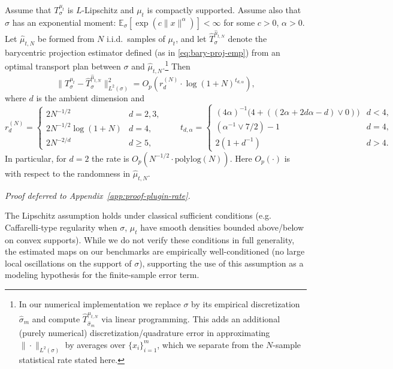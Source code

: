\documentclass[11pt]{article}
\newcommand{\1}{\mathbf{1}}
\begin{document}
\begin{proposition}
\label{prop:plug-in-rate}
Assume that $T_\sigma^{\mu_t}$ is $L$-Lipschitz and $\mu_t$ is compactly supported. Assume also that $\sigma$ has an exponential moment:
$\mathbb{E}_\sigma[\exp(c\|x\|^\alpha)] < \infty$ for some $c > 0$, $\alpha > 0$.
Let $\hat{\mu}_{t,N}$ be formed from $N$ i.i.d.\ samples of $\mu_t$, and let
$\hat{T}_\sigma^{\hat{\mu}_{t,N}}$ denote the barycentric projection estimator
defined (as in \eqref{eq:bary-proj-emp}) from an optimal transport plan between
$\sigma$ and $\hat{\mu}_{t,N}$.\footnote{In our numerical implementation we
replace $\sigma$ by its empirical discretization $\hat{\sigma}_m$ and compute
$\hat{T}_{\hat{\sigma}_m}^{\hat{\mu}_{t,N}}$ via linear programming. This adds
an additional (purely numerical) discretization/quadrature error in approximating
$\|\cdot\|_{L^2(\sigma)}$ by averages over $\{x_i\}_{i=1}^m$, which we separate
from the $N$-sample statistical rate stated here.}
Then
\begin{equation}\label{eq:plugin-rate}
  \|T_\sigma^{\mu_t}
  - \hat{T}_\sigma^{\hat{\mu}_{t,N}}\|_{L^2(\sigma)}^2
  = O_p\!\left(r_d^{(N)} \cdot \log(1+N)^{t_{d,\alpha}}\right),
\end{equation}
where $d$ is the ambient dimension and
\[
  r_d^{(N)} =
  \begin{cases}
    2N^{-1/2}            & d = 2,3, \\
    2N^{-1/2}\log(1+N)   & d = 4, \\
    2N^{-2/d}            & d \geq 5,
  \end{cases}
  \qquad
  t_{d,\alpha} =
  \begin{cases}
    (4\alpha)^{-1}\bigl(4 + ((2\alpha + 2d\alpha - d) \vee 0)\bigr)
                                                        & d < 4, \\
    (\alpha^{-1} \vee 7/2)-1                        & d = 4, \\
    2(1 + d^{-1})                                       & d > 4.
  \end{cases}
\]
In particular, for $d = 2$ the rate is $O_p(N^{-1/2}\cdot \mathrm{polylog}(N))$. Here $O_p(\cdot)$ is with respect to the randomness in $\hat{\mu}_{t,N}$.
\end{proposition}
\noindent\emph{Proof deferred to Appendix~\ref{app:proof-plugin-rate}.}

\begin{remark}\label{rmk:lipschitz}
The Lipschitz assumption holds under classical sufficient conditions (e.g. Caffarelli-type regularity when $\sigma$, $\mu_t$ have smooth densities bounded above/below on convex supports). While we do not verify these conditions in full generality, the estimated maps on our benchmarks are empirically well-conditioned (no large local oscillations on the support of $\sigma$), supporting the use of this assumption as a modeling hypothesis for the finite-sample error term. \\
\end{remark}
\end{document}
